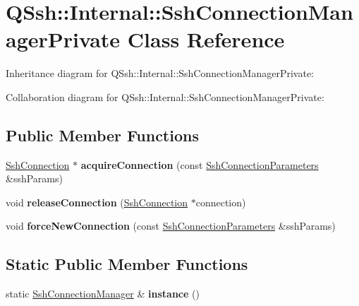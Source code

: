 \hypertarget{class_q_ssh_1_1_internal_1_1_ssh_connection_manager_private}{}\section{Q\+Ssh\+:\+:Internal\+:\+:Ssh\+Connection\+Manager\+Private Class Reference}
\label{class_q_ssh_1_1_internal_1_1_ssh_connection_manager_private}


Inheritance diagram for Q\+Ssh\+:\+:Internal\+:\+:Ssh\+Connection\+Manager\+Private\+:


Collaboration diagram for Q\+Ssh\+:\+:Internal\+:\+:Ssh\+Connection\+Manager\+Private\+:
\subsection*{Public Member Functions}
\begin{DoxyCompactItemize}
\item 
\mbox{\label{class_q_ssh_1_1_internal_1_1_ssh_connection_manager_private_ad58cd6f9c82979249413b90841254fc9}} 
\mbox{\hyperlink{class_q_ssh_1_1_ssh_connection}{Ssh\+Connection}} $\ast$ {\bfseries acquire\+Connection} (const \mbox{\hyperlink{class_q_ssh_1_1_ssh_connection_parameters}{Ssh\+Connection\+Parameters}} \&ssh\+Params)
\item 
\mbox{\label{class_q_ssh_1_1_internal_1_1_ssh_connection_manager_private_ab8b9b2343a82619d2ffddcde3235d1db}} 
void {\bfseries release\+Connection} (\mbox{\hyperlink{class_q_ssh_1_1_ssh_connection}{Ssh\+Connection}} $\ast$connection)
\item 
\mbox{\label{class_q_ssh_1_1_internal_1_1_ssh_connection_manager_private_a04551cf952760dfe4d998a3861fb0d5f}} 
void {\bfseries force\+New\+Connection} (const \mbox{\hyperlink{class_q_ssh_1_1_ssh_connection_parameters}{Ssh\+Connection\+Parameters}} \&ssh\+Params)
\end{DoxyCompactItemize}
\subsection*{Static Public Member Functions}
\begin{DoxyCompactItemize}
\item 
\mbox{\label{class_q_ssh_1_1_internal_1_1_ssh_connection_manager_private_a711e39123d29075ac2c7f3c5af2dc41a}} 
static \mbox{\hyperlink{class_q_ssh_1_1_ssh_connection_manager}{Ssh\+Connection\+Manager}} \& {\bfseries instance} ()
\end{DoxyCompactItemize}
